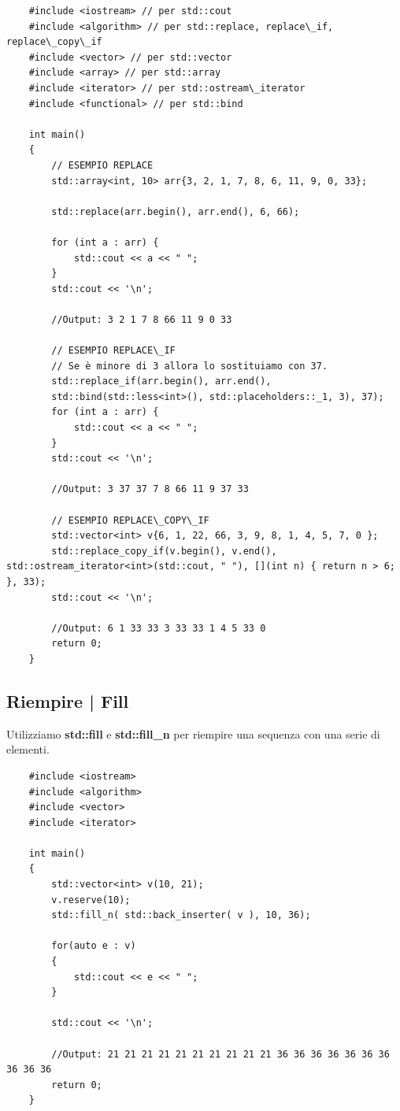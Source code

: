 \begin{lstlisting}
	#include <iostream> // per std::cout
	#include <algorithm> // per std::replace, replace\_if, replace\_copy\_if
	#include <vector> // per std::vector
	#include <array> // per std::array
	#include <iterator> // per std::ostream\_iterator
	#include <functional> // per std::bind
	
	int main()
	{
		// ESEMPIO REPLACE
		std::array<int, 10> arr{3, 2, 1, 7, 8, 6, 11, 9, 0, 33};
		
		std::replace(arr.begin(), arr.end(), 6, 66);
		
		for (int a : arr) {
			std::cout << a << " ";
		}
		std::cout << '\n';
		
		//Output: 3 2 1 7 8 66 11 9 0 33
		
		// ESEMPIO REPLACE\_IF
		// Se è minore di 3 allora lo sostituiamo con 37.
		std::replace_if(arr.begin(), arr.end(), 
		std::bind(std::less<int>(), std::placeholders::_1, 3), 37);
		for (int a : arr) {
			std::cout << a << " ";
		}
		std::cout << '\n';
		
		//Output: 3 37 37 7 8 66 11 9 37 33
		
		// ESEMPIO REPLACE\_COPY\_IF
		std::vector<int> v{6, 1, 22, 66, 3, 9, 8, 1, 4, 5, 7, 0 };
		std::replace_copy_if(v.begin(), v.end(), std::ostream_iterator<int>(std::cout, " "), [](int n) { return n > 6; }, 33);
		std::cout << '\n';
		
		//Output: 6 1 33 33 3 33 33 1 4 5 33 0
		return 0;
	}
\end{lstlisting}

\subsection{Riempire | Fill}

\textsf{\small Utilizziamo \textbf{std::fill} e \textbf{std::fill\_n} per riempire una sequenza con una serie di elementi.} \\

\begin{lstlisting}
	#include <iostream>
	#include <algorithm>
	#include <vector>
	#include <iterator>
	
	int main()
	{
		std::vector<int> v(10, 21);
		v.reserve(10);
		std::fill_n( std::back_inserter( v ), 10, 36);
		
		for(auto e : v)
		{
			std::cout << e << " ";
		}
	
		std::cout << '\n';
		
		//Output: 21 21 21 21 21 21 21 21 21 21 36 36 36 36 36 36 36 36 36 36
		return 0;
	}
\end{lstlisting}

